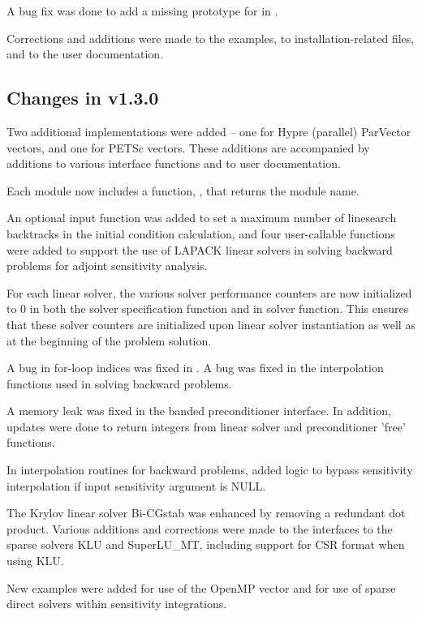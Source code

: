 A bug fix was done to add a missing prototype for  
in .
 
Corrections and additions were made to the examples, 
to installation-related files,
and to the user documentation.


\subsection*{Changes in v1.3.0}

Two additional {\nvector} implementations were added -- one for
Hypre (parallel) ParVector vectors, and one for PETSc vectors.  These
additions are accompanied by additions to various interface functions
and to user documentation.

Each {\nvector} module now includes a function, ,
that returns the {\nvector} module name.

An optional input function was added to set a maximum number
of linesearch backtracks in the initial condition calculation, and
four user-callable functions were added to support the use of LAPACK
linear solvers in solving backward problems for adjoint sensitivity
analysis.

For each linear solver, the various solver performance counters are
now initialized to 0 in both the solver specification function and in
solver  function.  This ensures that these solver counters
are initialized upon linear solver instantiation as well as at the
beginning of the problem solution.

A bug in for-loop indices was fixed in . A bug was
fixed in the interpolation functions used in solving backward problems.

A memory leak was fixed in the banded preconditioner interface.
In addition, updates were done to return integers from linear solver 
and preconditioner 'free' functions.

In interpolation routines for backward problems, added logic to bypass 
sensitivity interpolation if input sensitivity argument is NULL.

The Krylov linear solver Bi-CGstab was enhanced by removing a redundant
dot product.  Various additions and corrections were made to the
interfaces to the sparse solvers KLU and SuperLU\_MT, including support
for CSR format when using KLU.

New examples were added for use of the OpenMP vector and for use of 
sparse direct solvers within sensitivity integrations.

